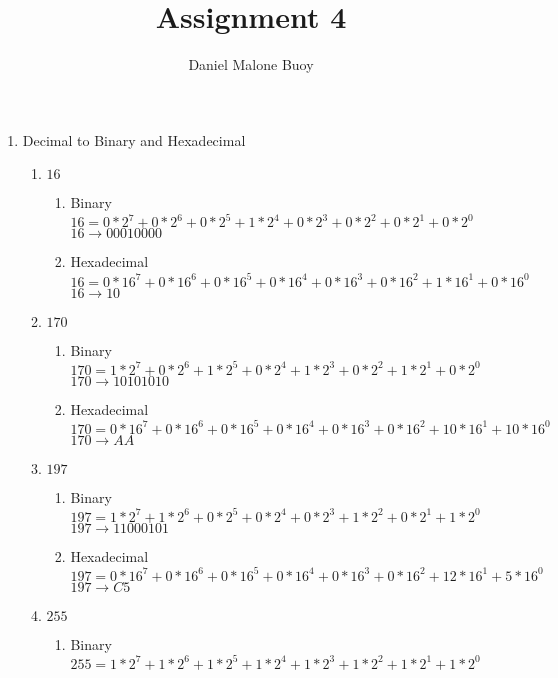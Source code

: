 \documentclass{article}
\title{Assignment 4}
\author{Daniel Malone Buoy}
\begin{document}
\maketitle
\begin{enumerate}
\item Decimal to Binary and Hexadecimal
\begin{enumerate}
\item $16$
\begin{enumerate}
\item Binary\\
$16 = 0*2^{7} + 0*2^{6} + 0*2^{5} + 1*2^{4} + 0*2^{3} + 0*2^{2} + 0*2^{1} + 0*2^{0}$\\
$16 \rightarrow 00010000$
\item Hexadecimal\\
$16 = 0*16^{7} + 0*16^{6} + 0*16^{5} + 0*16^{4} + 0*16^{3} + 0*16^{2} + 1*16^{1} + 0*16^{0}$\\
$16 \rightarrow 10$
\end{enumerate}
\item $170$
\begin{enumerate}
\item Binary\\
$170 = 1*2^{7} + 0*2^{6} + 1*2^{5} + 0*2^{4} + 1*2^{3} + 0*2^{2} + 1*2^{1} + 0*2^{0}$\\
$170 \rightarrow 10101010$
\item Hexadecimal\\
$170 = 0*16^{7} + 0*16^{6} + 0*16^{5} + 0*16^{4} + 0*16^{3} + 0*16^{2} + 10*16^{1} + 10*16^{0}$\\
$170 \rightarrow AA$
\end{enumerate}
\item $197$
\begin{enumerate}
\item Binary\\
$197 = 1*2^{7} + 1*2^{6} + 0*2^{5} + 0*2^{4} + 0*2^{3} + 1*2^{2} + 0*2^{1} + 1*2^{0}$\\
$197 \rightarrow 11000101$
\item Hexadecimal\\
$197 = 0*16^{7} + 0*16^{6} + 0*16^{5} + 0*16^{4} + 0*16^{3} + 0*16^{2} + 12*16^{1} + 5*16^{0}$\\
$197 \rightarrow C5$
\end{enumerate}
\item $255$
\begin{enumerate}
\item Binary\\
$255 = 1*2^{7} + 1*2^{6} + 1*2^{5} + 1*2^{4} + 1*2^{3} + 1*2^{2} + 1*2^{1} + 1*2^{0}$\\

\end{enumerate}
\end{enumerate}
\end{enumerate}
\end{document}
